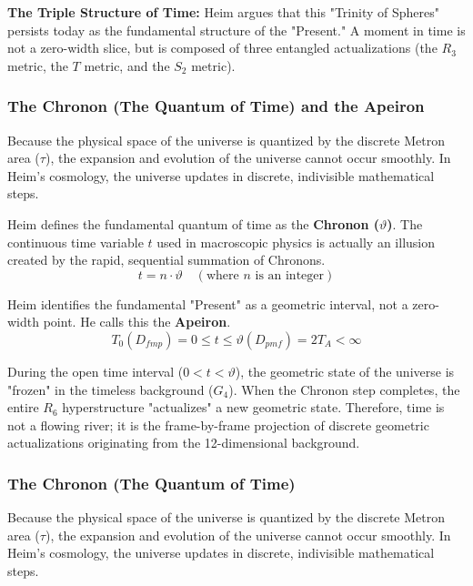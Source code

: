 \documentclass[11pt,a4paper,oneside]{article}
\begin{document}
\begin{mbbcite}
    \textbf{The Triple Structure of Time:} Heim argues that this "Trinity of Spheres" persists today as the fundamental structure of the "Present." A moment in time is not a zero-width slice, but is composed of three entangled actualizations (the $R_3$ metric, the $T$ metric, and the $S_2$ metric). 
\end{mbbcite}

\subsubsection{The Chronon (The Quantum of Time) and the Apeiron}
Because the physical space of the universe is quantized by the discrete Metron area ($\tau$), the expansion and evolution of the universe cannot occur smoothly. In Heim's cosmology, the universe updates in discrete, indivisible mathematical steps.

Heim defines the fundamental quantum of time as the \textbf{Chronon ($\vartheta$)}. The continuous time variable $t$ used in macroscopic physics is actually an illusion created by the rapid, sequential summation of Chronons. 
\begin{equation}
    t = n \cdot \vartheta \quad (\text{where } n \text{ is an integer})
\end{equation}

Heim identifies the fundamental "Present" as a geometric interval, not a zero-width point. He calls this the \textbf{Apeiron}. 
\begin{equation}
    T_0(D_{fmp}) = 0 \le t \le \vartheta(D_{pmf}) = 2 T_A < \infty
\end{equation}

During the open time interval ($0 < t < \vartheta$), the geometric state of the universe is "frozen" in the timeless background ($G_4$). When the Chronon step completes, the entire $R_6$ hyperstructure "actualizes" a new geometric state. Therefore, time is not a flowing river; it is the frame-by-frame projection of discrete geometric actualizations originating from the 12-dimensional background.

\subsubsection{The Chronon (The Quantum of Time)}
Because the physical space of the universe is quantized by the discrete Metron area ($\tau$), the expansion and evolution of the universe cannot occur smoothly. In Heim's cosmology, the universe updates in discrete, indivisible mathematical steps.
\end{document}
